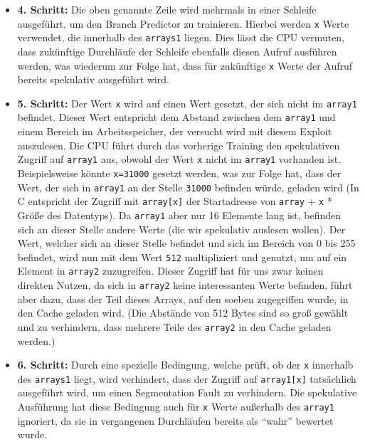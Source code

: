 \begin{itemize}
	\item \textbf{4. Schritt:}\label{itm:spectre_step4} Die oben genannte Zeile wird mehrmals in einer Schleife ausgeführt, um den Branch Predictor zu trainieren.
	      Hierbei werden \texttt{x} Werte verwendet, die innerhalb des \texttt{arrays1} liegen.
	      Dies lässt die CPU vermuten, dass zukünftige Durchläufe der Schleife ebenfalls diesen Aufruf ausführen werden, was wiederum zur Folge hat, dass für zukünftige \texttt{x} Werte der Aufruf bereits spekulativ ausgeführt wird.
	\item \textbf{5. Schritt:} Der Wert \texttt{x} wird auf einen Wert gesetzt, der sich nicht im \texttt{array1} befindet.
	      Dieser Wert entspricht dem Abstand zwischen dem \texttt{array1} und einem Bereich im Arbeitsspeicher, der versucht wird mit diesem Exploit auszulesen.
	      Die CPU führt durch das vorherige Training den spekulativen Zugriff auf \texttt{array1} aus, obwohl der Wert \texttt{x} nicht im \texttt{array1} vorhanden ist.
	      Beispielsweise könnte \texttt{x=31000} gesetzt werden, was zur Folge hat, dass der Wert, der sich in \texttt{array1} an der Stelle \texttt{31000} befinden würde, geladen wird (In C entspricht der Zugriff mit \texttt{array[x]} der Startadresse von \texttt{array} + \texttt{x} * Größe des Datentyps).
	      Da \texttt{array1} aber nur 16 Elemente lang ist, befinden sich an dieser Stelle andere Werte (die wir spekulativ auslesen wollen).
	      Der Wert, welcher sich an dieser Stelle befindet und sich im Bereich von 0 bis 255 befindet, wird nun mit dem Wert \texttt{512} multipliziert und genutzt, um auf ein Element in \texttt{array2} zuzugreifen.
	      Dieser Zugriff hat für uns zwar keinen direkten Nutzen, da sich in \texttt{array2} keine interessanten Werte befinden, führt aber dazu, dass der Teil dieses Arrays, auf den soeben zugegriffen wurde, in den Cache geladen wird.
	      (Die Abstände von 512 Bytes sind so groß gewählt und zu verhindern, dass mehrere Teile des \texttt{array2} in den Cache geladen werden.)
	\item \textbf{6. Schritt:} Durch eine spezielle Bedingung, welche prüft, ob der \texttt{x} innerhalb des \texttt{arrays1} liegt, wird verhindert, dass der Zugriff auf \texttt{array1[x]} tatsächlich ausgeführt wird, um einen Segmentation Fault zu verhindern.
	      Die spekulative Ausführung hat diese Bedingung auch für \texttt{x} Werte außerhalb des \texttt{array1} ignoriert, da sie in vergangenen Durchläufen bereits als \enquote{wahr} bewertet wurde.

\end{itemize}
